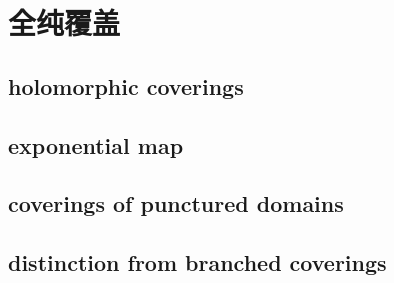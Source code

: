 \section{全纯覆盖}
\label{b3:sec:1102}


\subsection{holomorphic coverings}
\label{b3:subsec:110201}

\subsection{exponential map}
\label{b3:subsec:110202}

\subsection{coverings of punctured domains}
\label{b3:subsec:110203}

\subsection{distinction from branched coverings}
\label{b3:subsec:110204}


